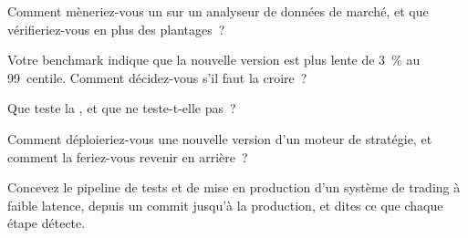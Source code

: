 \begin{interviewq}\label{iq:ll:testing-and-deploying-low-latency-systems:2}
Comment mèneriez-vous un  sur un analyseur de données de marché, et que vérifieriez-vous en plus des plantages~?
\end{interviewq}

\begin{interviewq}\label{iq:ll:testing-and-deploying-low-latency-systems:3}
Votre benchmark indique que la nouvelle version est plus lente de 3~\% au 99~centile. Comment décidez-vous s'il faut la croire~?
\end{interviewq}

\begin{interviewq}\label{iq:ll:testing-and-deploying-low-latency-systems:4}
Que teste la , et que ne teste-t-elle pas~?
\end{interviewq}

\begin{interviewq}\label{iq:ll:testing-and-deploying-low-latency-systems:5}
Comment déploieriez-vous une nouvelle version d'un moteur de stratégie, et comment la feriez-vous revenir en arrière~?
\end{interviewq}

\begin{interviewq}\label{iq:ll:testing-and-deploying-low-latency-systems:6}
Concevez le pipeline de tests et de mise en production d'un système de trading à faible latence, depuis un commit jusqu'à la production, et dites ce que chaque étape
détecte.
\end{interviewq}
